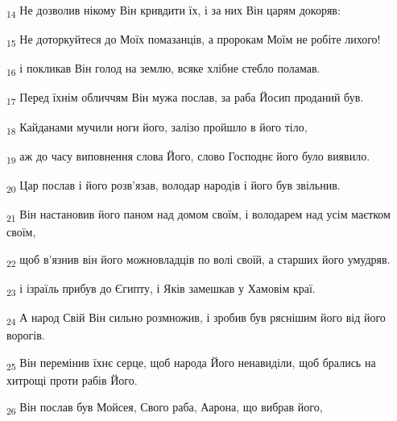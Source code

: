 \begin{tcolorbox}
\textsubscript{14} Не дозволив нікому Він кривдити їх, і за них Він царям докоряв:
\end{tcolorbox}
\begin{tcolorbox}
\textsubscript{15} Не доторкуйтеся до Моїх помазанців, а пророкам Моїм не робіте лихого!
\end{tcolorbox}
\begin{tcolorbox}
\textsubscript{16} і покликав Він голод на землю, всяке хлібне стебло поламав.
\end{tcolorbox}
\begin{tcolorbox}
\textsubscript{17} Перед їхнім обличчям Він мужа послав, за раба Йосип проданий був.
\end{tcolorbox}
\begin{tcolorbox}
\textsubscript{18} Кайданами мучили ноги його, залізо пройшло в його тіло,
\end{tcolorbox}
\begin{tcolorbox}
\textsubscript{19} аж до часу виповнення слова Його, слово Господнє його було виявило.
\end{tcolorbox}
\begin{tcolorbox}
\textsubscript{20} Цар послав і його розв'язав, володар народів і його був звільнив.
\end{tcolorbox}
\begin{tcolorbox}
\textsubscript{21} Він настановив його паном над домом своїм, і володарем над усім маєтком своїм,
\end{tcolorbox}
\begin{tcolorbox}
\textsubscript{22} щоб в'язнив він його можновладців по волі своїй, а старших його умудряв.
\end{tcolorbox}
\begin{tcolorbox}
\textsubscript{23} і ізраїль прибув до Єгипту, і Яків замешкав у Хамовім краї.
\end{tcolorbox}
\begin{tcolorbox}
\textsubscript{24} А народ Свій Він сильно розмножив, і зробив був ряснішим його від його ворогів.
\end{tcolorbox}
\begin{tcolorbox}
\textsubscript{25} Він перемінив їхнє серце, щоб народа Його ненавиділи, щоб брались на хитрощі проти рабів Його.
\end{tcolorbox}
\begin{tcolorbox}
\textsubscript{26} Він послав був Мойсея, Свого раба, Аарона, що вибрав його,
\end{tcolorbox}
